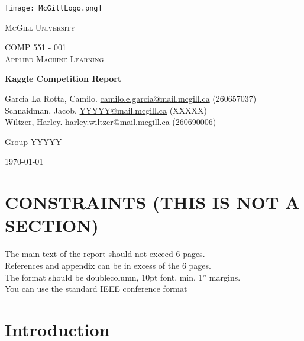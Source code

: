 \documentclass[10pt, hidelinks]{article}
\begin{document}

\begin{titlepage}
    \begin{center}
        \texttt{[image: McGillLogo.png]}~\par\vspace{1cm}
        {\scshape\LARGE McGill University \par}
        \vspace{1cm}
        {\scshape\Large COMP 551 - 001 \\ Applied Machine Learning\par}
        \vspace{1.5cm}
        {\huge\bfseries Kaggle Competition Report\par}
        \vspace{2cm}
        {\Large Garcia La Rotta, Camilo. \href{mailto:camilo.e.garcia@mail.mcgill.ca}{camilo.e.garcia@mail.mcgill.ca} (260657037)}\\
        {\Large Schnaidman, Jacob. \href{mailto:YYYYY@mail.mcgill.ca}{YYYYY@mail.mcgill.ca} (XXXXX)}\\
        {\Large Wiltzer, Harley. \href{mailto:harley.wiltzer@mail.mcgill.ca}{harley.wiltzer@mail.mcgill.ca} (260690006)}
        \vfill
        {\large Group YYYYY\par}
        \vfill
        {\large \today\par}
    \end{center}
\end{titlepage}

\newpage

\section*{CONSTRAINTS (THIS IS NOT A SECTION)}
The main text of the report should not exceed 6 pages.\\
References and appendix can be in excess of the 6 pages.\\   
The format should be doublecolumn, 10pt font, min. 1” margins.\\  
You can use the standard IEEE conference format

\section*{Introduction}
\end{document}
